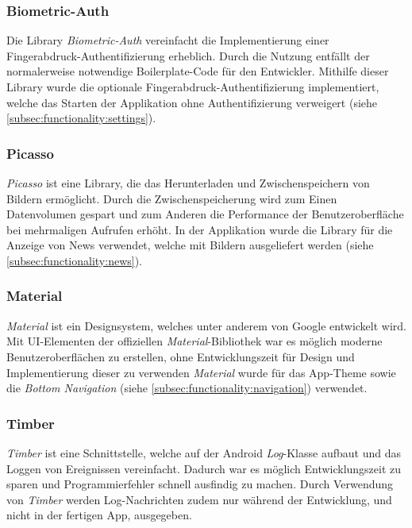 \documentclass[a4paper]{article}
\begin{document}
\subsubsection{Biometric-Auth}
\label{subsubsec:technologies:bibs:biometricauth}
Die Library \textit{Biometric-Auth} \autocite{biometricauth} vereinfacht die Implementierung einer Fingerabdruck-Authentifizierung erheblich. Durch die Nutzung entfällt der normalerweise notwendige Boilerplate-Code für den Entwickler. Mithilfe dieser Library wurde die optionale Fingerabdruck-Authentifizierung implementiert, welche das Starten der Applikation ohne Authentifizierung verweigert (siehe \autoref{subsec:functionality:settings}).


\subsubsection{Picasso}
\label{subsubsec:technologies:bibs:picasso}
\textit{Picasso} \autocite{picasso} ist eine Library, die das Herunterladen und Zwischenspeichern von Bildern ermöglicht. Durch die Zwischenspeicherung wird zum Einen Datenvolumen gespart und zum Anderen die Performance der Benutzeroberfläche bei mehrmaligen Aufrufen erhöht. In der Applikation wurde die Library für die Anzeige von News verwendet, welche mit Bildern ausgeliefert werden (siehe \autoref{subsec:functionality:news}).


\subsubsection{Material}
\label{subsubsec:technologies:bibs:material}
\textit{Material} ist ein Designsystem, welches unter anderem von Google entwickelt wird.
Mit UI-Elementen der offiziellen \textit{Material}-Bibliothek war es möglich moderne Benutzeroberflächen zu erstellen, ohne Entwicklungszeit für Design und Implementierung dieser zu verwenden
\textit{Material} wurde für das App-Theme sowie die \textit{Bottom Navigation} (siehe \autoref{subsec:functionality:navigation}) verwendet.


\subsubsection{Timber}
\label{subsubsec:technologies:bibs:timber}
\textit{Timber} ist eine Schnittstelle, welche auf der Android \textit{Log}-Klasse aufbaut und das Loggen von Ereignissen vereinfacht.
Dadurch war es möglich Entwicklungszeit zu sparen und Programmierfehler schnell ausfindig zu machen.
Durch Verwendung von \textit{Timber} werden Log-Nachrichten zudem nur während der Entwicklung, und nicht in der fertigen App, ausgegeben.
\end{document}
